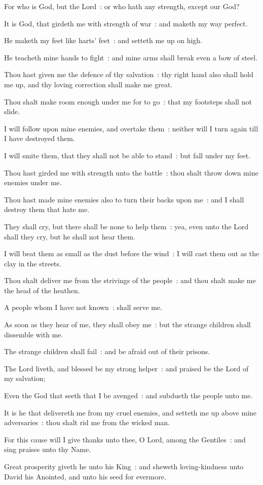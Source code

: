 For who is God, but the Lord~: or who hath any strength, except our God?\par
{}It is God, that girdeth me with strength of war~: and maketh my way perfect.\par
{}He maketh my feet like harts' feet~: and setteth me up on high.\par
{}He teacheth mine hands to fight~: and mine arms shall break even a bow of steel.\par
{}Thou hast given me the defence of thy salvation~: thy right hand also shall hold me up, and thy loving correction shall make me great.\par
{}Thou shalt make room enough under me for to go~: that my footsteps shall not slide.\par
{}I will follow upon mine enemies, and overtake them~: neither will I turn again till I have destroyed them.\par
{}I will smite them, that they shall not be able to stand~: but fall under my feet.\par
{}Thou hast girded me with strength unto the battle~: thou shalt throw down mine enemies under me.\par
{}Thou hast made mine enemies also to turn their backs upon me~: and I shall destroy them that hate me.\par
{}They shall cry, but there shall be none to help them~: yea, even unto the Lord shall they cry, but he shall not hear them.\par
{}I will beat them as small as the dust before the wind~: I will cast them out as the clay in the streets.\par
{}Thou shalt deliver me from the strivings of the people~: and thou shalt make me the head of the heathen.\par
{}A people whom I have not known~: shall serve me.\par
{}As soon as they hear of me, they shall obey me~: but the strange children shall dissemble with me.\par
{}The strange children shall fail~: and be afraid out of their prisons.\par
{}The Lord liveth, and blessed be my strong helper~: and praised be the Lord of my salvation;\par
{}Even the God that seeth that I be avenged~: and subdueth the people unto me.\par
{}It is he that delivereth me from my cruel enemies, and setteth me up above mine adversaries~: thou shalt rid me from the wicked man.\par
{}For this cause will I give thanks unto thee, O Lord, among the Gentiles~: and sing praises unto thy Name.\par
{}Great prosperity giveth he unto his King~: and sheweth loving-kindness unto David his Anointed, and unto his seed for evermore.\par

